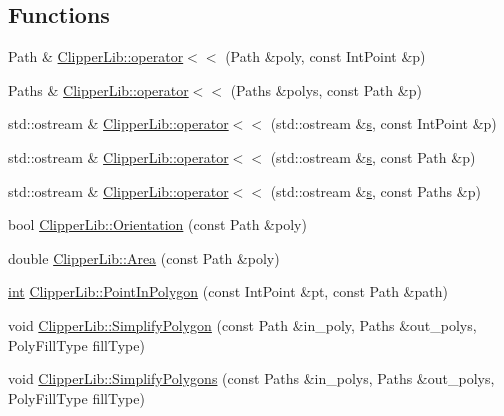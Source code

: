 \subsection*{Functions}
\begin{DoxyCompactItemize}
\item 
Path \& \mbox{\hyperlink{namespace_clipper_lib_a7783da3ed1c2354e45db83cecc596c7e}{Clipper\+Lib\+::operator$<$$<$}} (Path \&poly, const Int\+Point \&p)
\item 
Paths \& \mbox{\hyperlink{namespace_clipper_lib_aa0bb38565ca4b15c637b38f476d21036}{Clipper\+Lib\+::operator$<$$<$}} (Paths \&polys, const Path \&p)
\item 
std\+::ostream \& \mbox{\hyperlink{namespace_clipper_lib_a2e9613a92f21ac827d5b7f8b5ade5795}{Clipper\+Lib\+::operator$<$$<$}} (std\+::ostream \&\mbox{\hyperlink{detection_8cc_a9090f9756293390c57567a0bf7630abf}{s}}, const Int\+Point \&p)
\item 
std\+::ostream \& \mbox{\hyperlink{namespace_clipper_lib_abd88603a8c170404d069edae2e574fe9}{Clipper\+Lib\+::operator$<$$<$}} (std\+::ostream \&\mbox{\hyperlink{detection_8cc_a9090f9756293390c57567a0bf7630abf}{s}}, const Path \&p)
\item 
std\+::ostream \& \mbox{\hyperlink{namespace_clipper_lib_aa8b8872f6e4840cb63769a59a88eab4d}{Clipper\+Lib\+::operator$<$$<$}} (std\+::ostream \&\mbox{\hyperlink{detection_8cc_a9090f9756293390c57567a0bf7630abf}{s}}, const Paths \&p)
\item 
bool \mbox{\hyperlink{namespace_clipper_lib_a806a3d33d76bb9d4479d384f876ce8bd}{Clipper\+Lib\+::\+Orientation}} (const Path \&poly)
\item 
double \mbox{\hyperlink{namespace_clipper_lib_a4a96cc48117e1dba6cf51bbc2d91fe97}{Clipper\+Lib\+::\+Area}} (const Path \&poly)
\item 
\mbox{\hyperlink{draw_8hh_aa620a13339ac3a1177c86edc549fda9b}{int}} \mbox{\hyperlink{namespace_clipper_lib_ac7314f2a1f45c627bac20e9ba2a68212}{Clipper\+Lib\+::\+Point\+In\+Polygon}} (const Int\+Point \&pt, const Path \&path)
\item 
void \mbox{\hyperlink{namespace_clipper_lib_af374cea59a991e49f36c3530efc45feb}{Clipper\+Lib\+::\+Simplify\+Polygon}} (const Path \&in\+\_\+poly, Paths \&out\+\_\+polys, Poly\+Fill\+Type fill\+Type)
\item 
void \mbox{\hyperlink{namespace_clipper_lib_ac9ebbe437e4c08816bffeced6d001cf6}{Clipper\+Lib\+::\+Simplify\+Polygons}} (const Paths \&in\+\_\+polys, Paths \&out\+\_\+polys, Poly\+Fill\+Type fill\+Type)
\item 

\end{DoxyCompactItemize}
